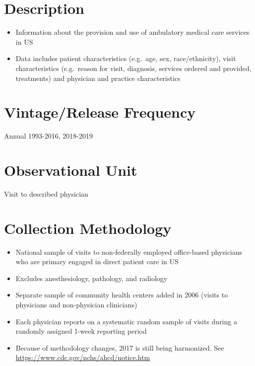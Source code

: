 \documentclass[
]{book}
\providecommand{\tightlist}{%
  \setlength{\itemsep}{0pt}\setlength{\parskip}{0pt}}
\begin{document}
\hypertarget{description-42}{%
\section{Description}\label{description-42}}

\begin{itemize}
\tightlist
\item
  Information about the provision and use of ambulatory medical care services in US
\item
  Data includes patient characteristics (e.g.~age, sex, race/ethnicity), visit characteristics (e.g.~reason for visit, diagnosis, services ordered and provided, treatments) and physician and practice characteristics
\end{itemize}

\hypertarget{vintagerelease-frequency-42}{%
\section{Vintage/Release Frequency}\label{vintagerelease-frequency-42}}

Annual 1993-2016, 2018-2019

\hypertarget{observational-unit-42}{%
\section{Observational Unit}\label{observational-unit-42}}

Visit to described physician

\hypertarget{collection-methodology-42}{%
\section{Collection Methodology}\label{collection-methodology-42}}

\begin{itemize}
\tightlist
\item
  National sample of visits to non-federally employed office-based physicians who are primary engaged in direct patient care in US
\item
  Excludes anesthesiology, pathology, and radiology
\item
  Separate sample of community health centers added in 2006 (visits to physicians and non-physician clinicians)
\item
  Each physician reports on a systematic random sample of visits during a randomly assigned 1-week reporting period
\item
  Because of methodology changes, 2017 is still being harmonized. See \url{https://www.cdc.gov/nchs/ahcd/notice.htm}
\end{itemize}
\end{document}
